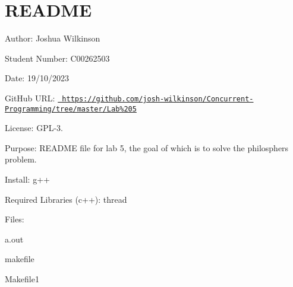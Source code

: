 \chapter{README}
\hypertarget{md__r_e_a_d_m_e}{}\label{md__r_e_a_d_m_e}
\label{md__r_e_a_d_m_e_autotoc_md0}%
%
 Author\+: Joshua Wilkinson

Student Number\+: C00262503

Date\+: 19/10/2023

Git\+Hub URL\+: \href{https://github.com/josh-wilkinson/Concurrent-Programming/tree/master/Lab\%205}{\texttt{ https\+://github.\+com/josh-\/wilkinson/\+Concurrent-\/\+Programming/tree/master/\+Lab\%205}}

License\+: GPL-\/3.

Purpose\+: README file for lab 5, the goal of which is to solve the philospher\textquotesingle{}s problem.

Install\+: g++

Required Libraries (c++)\+: thread

Files\+:
\begin{DoxyItemize}
\item a.\+out
\item {}
\item {}
\item {}
\item makefile
\item Makefile1
\item {} 
\end{DoxyItemize}